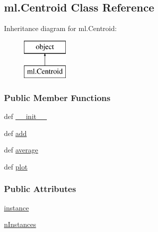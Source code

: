 \hypertarget{classml_1_1Centroid}{\subsection{ml.\-Centroid Class Reference}
\label{classml_1_1Centroid}
}
Inheritance diagram for ml.\-Centroid\-:\begin{figure}[H]
\begin{center}
\leavevmode
\includegraphics[height=2.000000cm]{classml_1_1Centroid}
\end{center}
\end{figure}
\subsubsection*{Public Member Functions}
\begin{DoxyCompactItemize}
\item 
def \hyperlink{classml_1_1Centroid_ad867dc3bdcf31ff91963990e903d2f1d}{\-\_\-\-\_\-init\-\_\-\-\_\-}
\item 
def \hyperlink{classml_1_1Centroid_aefdc64e2f2d22bd3609da26c0637a947}{add}
\item 
def \hyperlink{classml_1_1Centroid_a746c2a70a4573d307a3f612f9df346a5}{average}
\item 
def \hyperlink{classml_1_1Centroid_a200c3b51f7fd4bc249b6988e4d836d11}{plot}
\end{DoxyCompactItemize}
\subsubsection*{Public Attributes}
\begin{DoxyCompactItemize}
\item 
\hyperlink{classml_1_1Centroid_aff3c1bad9f79a88616bbfa01e04cca38}{instance}
\item 
\hyperlink{classml_1_1Centroid_a726bacc6a5580b80ec4f088700c16c32}{n\-Instances}
\end{DoxyCompactItemize}



